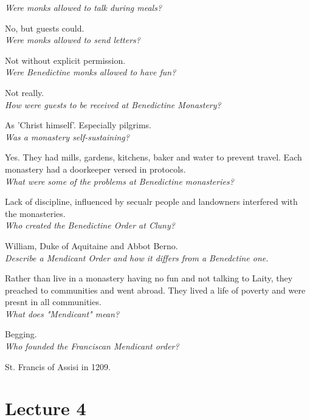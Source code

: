 \documentclass[12pt]{article}
\begin{document}
\textit{Were monks allowed to talk during meals?}

No, but guests could.\\

\textit{Were monks allowed to send letters?}

Not without explicit permission.\\

\textit{Were Benedictine monks allowed to have fun?}

Not really.\\

\textit{How were guests to be received at Benedictine Monastery?}

As 'Christ himself'. Especially pilgrims.\\

\textit{Was a monastery self-sustaining?}

Yes. They had mills, gardens, kitchens, baker and water to prevent travel. Each monastery had a doorkeeper versed in protocols.\\

\textit{What were some of the problems at Benedictine monasteries?}

Lack of discipline, influenced by secualr people and landowners interfered with the monasteries.\\

\textit{Who created the Benedictine Order at Cluny?}

William, Duke of Aquitaine and Abbot Berno.\\

\textit{Describe a Mendicant Order and how it differs from a Benedctine one.}

Rather than live in a monastery having no fun and not talking to Laity, they preached to communities and went abroad.
They lived a life of poverty and were presnt in all communities.\\

\textit{What does "Mendicant" mean?}

Begging.\\

\textit{Who founded the Franciscan Mendicant order?}

St. Francis of Assisi in 1209.\\

\section*{Lecture 4}
\end{document}
